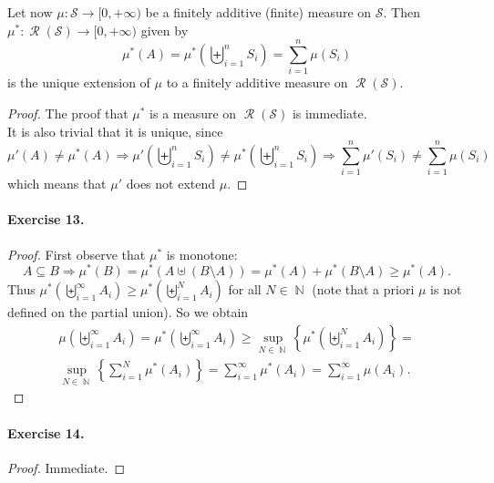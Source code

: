 \documentclass[12pt,a4paper]{report}
\theoremstyle{definition}
\theoremstyle{num.custom-title}
\DeclareMathOperator{\RR}{\mathcal{R}}
\DeclareMathOperator{\N}{\mathbb{N}}
\DeclareMathOperator{\imp}{\Rightarrow}
\DeclareMathOperator{\sm}{\setminus}
\DeclareMathOperator{\sse}{\subseteq}
\renewcommand{\S}{\mathcal{S}}
\renewcommand{\1}{\mathbbm{1}}
\begin{document}
Let now $\mu : \S \to [0,+\infty)$ be a finitely additive (finite) measure on $\S$. Then $\mu^* : \RR(\S) \to [0,+\infty)$ given by
\[
\mu^*(A)=\mu^* \left( \biguplus_{i=1}^n S_i \right) = \sum_{i=1}^n \mu(S_i)
\]
is the unique extension of $\mu$ to a finitely additive measure on $\RR(\S)$.
\begin{proof}
The proof that $\mu^*$ is a measure on $\RR(\S)$ is immediate.\\
It is also trivial that it is unique, since 
\[
\mu'(A) \neq \mu^*(A) \imp 
\mu' \left( \biguplus_{i=1}^n S_i \right) \neq \mu^* \left( \biguplus_{i=1}^n S_i \right) \imp  \sum_{i=1}^n \mu'(S_i) \neq  \sum_{i=1}^n \mu(S_i)
\]
which means that $\mu'$ does not extend $\mu$.
\end{proof}

\paragraph{Exercise 13.}
\begin{proof}
First observe that $\mu^*$ is monotone:
\[
A \sse B \imp \mu^*(B) = \mu^*(A \uplus (B \sm A)) = \mu^*(A)+\mu^*(B \sm A) \geq \mu^*(A).
\]
Thus $\mu^*(\biguplus_{i=1}^\infty A_i) \geq \mu^*(\biguplus_{i=1}^N A_i)$ for all $N \in \N$ (note that a priori $\mu$ is not defined on the partial union). So we obtain
\begin{multline*}
\mu \left( \biguplus_{i=1}^\infty A_i \right) = \mu^* \left( \biguplus_{i=1}^\infty A_i \right) \geq \sup_{N \in \N} \left\{ \mu^* \left( \biguplus_{i=1}^N A_i \right) \right\}= \\
\sup_{N \in \N} \left\{\sum_{i=1}^N \mu^*(A_i) \right\} = \sum_{i=1}^\infty \mu^*(A_i) = \sum_{i=1}^\infty \mu(A_i).
\end{multline*}
\end{proof}

\paragraph{Exercise 14.}
\begin{proof}
Immediate.
\end{proof}
\end{document}
